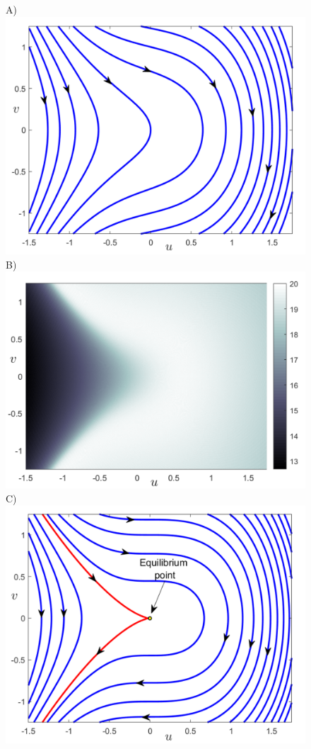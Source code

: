 \documentclass{ws-ijbc}
\begin{document}
\begin{figure}[htbp]
	\begin{center}
		A)\includegraphics[scale=0.32]{fig1a}
		B)\includegraphics[scale=0.36]{fig1b}
		C)\includegraphics[scale=0.32]{fig1c}

\end{center}
\end{figure}
\end{document}
